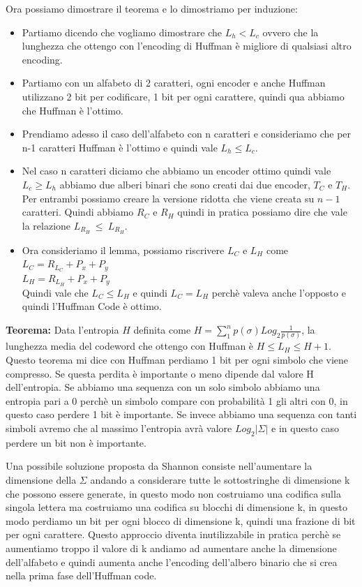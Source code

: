 \documentclass[14pt]{extreport}
\begin{document}
Ora possiamo dimostrare il teorema e lo dimostriamo per induzione:

\begin{itemize}
\item Partiamo dicendo che vogliamo dimostrare che $L_h<L_c$ ovvero che la lunghezza che ottengo con l'encoding di Huffman è migliore di qualsiasi altro encoding. 
\item Partiamo con un alfabeto di 2 caratteri, ogni encoder e anche Huffman utilizzano 2 bit per codificare, 1 bit per ogni carattere, quindi qua abbiamo che Huffman è l'ottimo.
\item Prendiamo adesso il caso dell'alfabeto con n caratteri e consideriamo che per n-1 caratteri Huffman è l'ottimo e quindi vale $L_h \leq L_c$.
\item Nel caso n caratteri diciamo che abbiamo un encoder ottimo quindi vale $L_c \geq L_h$ abbiamo due alberi binari che sono creati dai due encoder, $T_C$ e $T_H$. Per entrambi possiamo creare la versione ridotta che viene creata su $n-1$ caratteri. Quindi abbiamo $R_C$ e $R_H$ quindi in pratica possiamo dire che vale la relazione $L_{R_H}\ \leq \ L_{R_H}$.
\item Ora consideriamo il lemma, possiamo riscrivere $L_C$ e $L_H$ come \\ 
$L_C=R_{L_C}+P_x+P_y$ \\
$L_H=R_{L_H}+P_x+P_y$ \\
Quindi vale che $L_C \leq L_H$ e quindi $L_C = L_H$ perchè valeva anche l'opposto e quindi l'Huffman Code è ottimo. 
\end{itemize}

\textbf{Teorema:} Data l'entropia $H$ definita come $H=\sum^n_1 p(\sigma)Log_2\frac{1}{p(\sigma)}$, la lunghezza media del codeword che ottengo con Huffman è $H \leq L_H \leq H+1$. \\

Questo teorema mi dice con Huffman perdiamo 1 bit per ogni simbolo che viene compresso. Se questa perdita è importante o meno dipende dal valore H dell'entropia. Se abbiamo una sequenza con un solo simbolo abbiamo una entropia pari a 0 perchè un simbolo compare con probabilità 1 gli altri con 0, in questo caso perdere 1 bit è importante.
Se invece abbiamo una sequenza con tanti simboli avremo che al massimo l'entropia avrà valore $Log_2 |\Sigma|$ e in questo caso perdere un bit non è importante.

Una possibile soluzione proposta da Shannon consiste nell'aumentare la dimensione della $\Sigma$ andando a considerare tutte le sottostringhe di dimensione k che possono essere generate, in questo modo non costruiamo una codifica sulla singola lettera ma costruiamo una codifica su blocchi di dimensione k, in questo modo perdiamo un bit per ogni blocco di dimensione k, quindi una frazione di bit per ogni carattere.
Questo approccio diventa inutilizzabile in pratica perchè se aumentiamo troppo il valore di k andiamo ad aumentare anche la dimensione dell'alfabeto e quindi aumenta anche l'encoding dell'albero binario che si crea nella prima fase dell'Huffman code.
\end{document}
